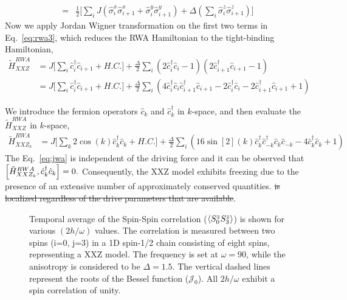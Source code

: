 \documentclass[aps,prb,reprint,showpacs,floatfix,superscriptaddress, onecolumn, nofootinbib, 9pt]{revtex4-2}
\begin{document}
\begin{enumerate}
{\begin{align}
				= & \frac12\Bigg[\sum_i J\left( \hat{\sigma}^x_i \hat{\sigma}^x_{i+1} + \hat{\sigma}^y_i \hat{\sigma}^y_{i+1} \right) + \Delta \left(\sum_{i}  \hat{\sigma}_{i}^{z} \hat{\sigma}_{i+1}^{z}\right)\Bigg]
				\label{eq:rwa3}
			\end{align}
			Now we apply Jordan Wigner transformation on the first two terms in Eq.~\eqref{eq:rwa3}, which reduces the RWA Hamiltonian to the tight-binding Hamiltonian, 
			\begin{align}
			\tilde{H}^{RWA}_{XXZ} &= J\Big[ \sum_i\hat{c}^\dagger_i\hat{c}_{i+1}  + H.C.\Big] + \frac{\Delta}{2}\sum_{i}  (2\hat{c}^\dagger_i\hat{c}_i-1) (2\hat{c}^\dagger_{i+1} \hat{c}_{i+1}-1)\nonumber\\
			&= J\Big[ \sum_i\hat{c}^\dagger_i\hat{c}_{i+1}  + H.C.\Big] + \frac{\Delta}{2}\sum_{i}  (4\hat{c}^\dagger_i\hat{c}_i \hat{c}^\dagger_{i+1} \hat{c}_{i+1} -2\hat{c}^\dagger_i\hat{c}_i-2\hat{c}^\dagger_{i+1}\hat{c}_{i+1}+1)
			\label{eq:jwa0}
			\end{align}
		
		We introduce the fermion operators $\hat{c}_k$ and $\hat{c}^\dagger_k$ in $k$-space, and then evaluate the $\tilde{H}^{RWA}_{XXZ}$ in $k$-space,
	\begin{align}
		\tilde{H}^{RWA}_{XXZ_k} &= J\Big[ \sum_k 2\cos(k)\hat{c}^\dagger_k\hat{c}_k  + H.C.\Big] + \frac{\Delta}{2}\sum_{i}  (16\sin[2](k) \hat{c}^\dagger_k\hat{c}^\dagger_{-k}\hat{c}_k\hat{c}_{-k}-4\hat{c}^\dagger_k\hat{c}_k+1)
		\label{eq:jwa}
	\end{align}
	The Eq.~\eqref{eq:jwa} is independent of the driving force and it can be observed that $\comm{\tilde{H}^{RWA}_{XXZ_k}}{\hat{c}^\dagger_k\hat{c}_k}=0.$ Consequently, the XXZ model exhibits freezing due to the presence of an extensive number of approximately conserved quantities. \sout{is localized regardless of the drive parameters that are available}. 
	\begin{figure}[t!]
		\caption{Temporal average of the Spin-Spin correlation ($\expval{S^z_0 S^z_3}$) is shown for various $(2h/\omega)$ values. The correlation is measured between two spins (i=0, j=3) in a 1D spin-1/2 chain consisting of eight spins, representing a XXZ model. The frequency is set at $\omega=90$, while the anisotropy is considered to be $\Delta=1.5$. The vertical dashed lines represent the roots of the Bessel function ($\mathcal{J}_0$). All $2h/\omega$ exhibit a spin correlation of unity.}
		\label{fig:xxz}
	\end{figure}

}
\end{enumerate}
\end{document}
